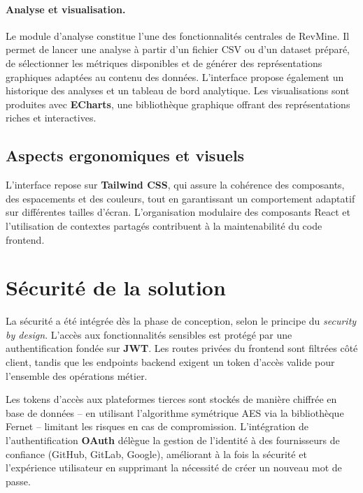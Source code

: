 \paragraph{Analyse et visualisation.} Le module d'analyse constitue l'une des fonctionnalités
centrales de RevMine. Il permet de lancer une analyse à partir d'un fichier CSV ou d'un dataset
préparé, de sélectionner les métriques disponibles et de générer des représentations graphiques
adaptées au contenu des données. L'interface propose également un historique des analyses et un
tableau de bord analytique. Les visualisations sont produites avec \textbf{ECharts}, une
bibliothèque graphique offrant des représentations riches et interactives.

\subsection{Aspects ergonomiques et visuels}

L'interface repose sur \textbf{Tailwind CSS}, qui assure la cohérence des composants, des
espacements et des couleurs, tout en garantissant un comportement adaptatif sur différentes
tailles d'écran. L'organisation modulaire des composants React et l'utilisation de contextes
partagés contribuent à la maintenabilité du code frontend.

\section{Sécurité de la solution}

La sécurité a été intégrée dès la phase de conception, selon le principe du
\textit{security by design}. L'accès aux fonctionnalités sensibles est protégé par une
authentification fondée sur \textbf{JWT}. Les routes privées du frontend sont filtrées côté
client, tandis que les endpoints backend exigent un token d'accès valide pour l'ensemble des
opérations métier.

Les tokens d'accès aux plateformes tierces sont stockés de manière chiffrée en base de données
-- en utilisant l'algorithme symétrique AES via la bibliothèque Fernet -- limitant les risques
en cas de compromission. L'intégration de l'authentification \textbf{OAuth} délègue la gestion
de l'identité à des fournisseurs de confiance (GitHub, GitLab, Google), améliorant à la fois la
sécurité et l'expérience utilisateur en supprimant la nécessité de créer un nouveau mot de passe.

